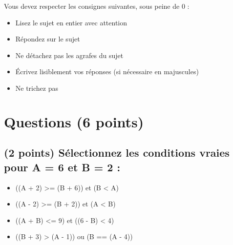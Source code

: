 \documentclass[11pt,a4paper]{article}
\begin{document}
\MakeExamTitle                   %



Vous devez respecter les consignes suivantes, sous peine de 0 :

\begin{itemize}
\item Lisez le sujet en entier avec attention
\item Répondez sur le sujet
\item Ne détachez pas les agrafes du sujet
\item \'Ecrivez lisiblement vos réponses (si nécessaire en majuscules)
\item Ne trichez pas
\end{itemize}



\section{Questions (6 points)}

\subsection{(2 points) Sélectionnez les conditions vraies pour A = 6 et B = 2 : }


\begin{table}[!ht]
  \centering
  \begin{minipage}{0.65\textwidth}
    \centering


\begin{itemize}  
  \item[\checkmark] ((A + 2) >= (B + 6)) et (B < A)   %
  \item[\CaseCoche] ((A - 2) >= (B + 2)) et (A < B)   %
  \item[\CaseCoche] ((A + B) <= 9) et ((6 - B) < 4)   %
  \item[\checkmark] ((B + 3) > (A - 1)) ou (B == (A - 4)) %
\end{itemize}


  \end{minipage}
  \hfillx
  \begin{minipage}{0.35\textwidth}
    \centering


  \end{minipage}
\end{table}
\end{document}
